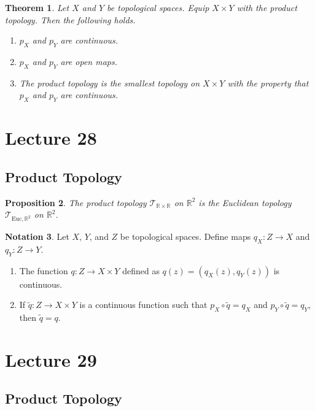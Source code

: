 \documentclass[ 12pt ]{article}
\newcounter{lecture_num}
\theoremstyle{plain}
\theoremstyle{plain}
\newtheorem{theorem}{Theorem}[lecture_num]
\newtheorem{proposition}[theorem]{Proposition}
\theoremstyle{definition}
\newtheorem{notation}[theorem]{Notation}
\theoremstyle{remark}
\begin{document}
\begin{theorem}
	Let $X$ and $Y$ be topological spaces. Equip $X \times Y$ with the product topology. Then the following holds.
	\begin{enumerate}
		\item $p_X$ and $p_Y$ are continuous.
		\item $p_X$ and $p_Y$ are open maps.
		\item The product topology is the \textit{smallest} topology on $X \times Y$ with the property that $p_X$ and $p_Y$ are continuous.
	\end{enumerate}
\end{theorem}


\setcounter{lecture_num}{28}
\setcounter{theorem}{0}
\section*{Lecture 28}

\subsection*{Product Topology}

\begin{proposition}
	The product topology $\mathcal{T}_{\mathbb{R} \times \mathbb{R}}$ on $\mathbb{R}^2$ is the Euclidean topology $\mathcal{T}_{\mathrm{Euc}, \mathbb{R}^2}$ on $\mathbb{R}^2$.
\end{proposition}

\begin{notation}
	Let $X$, $Y$, and $Z$ be topological spaces. Define maps $q_X : Z \to X$ and $q_Y : Z \to Y$.
	\begin{enumerate}
		\item The function $q : Z \to X \times Y$ defined as $q(z) = ( q_X(z), q_Y(z) )$ is continuous.
		\item If $\widetilde{q} : Z \to X \times Y$ is a continuous function such that $p_X \circ \widetilde{q} = q_X$ and $p_Y \circ \widetilde{q} = q_Y$, then $\widetilde{q} = q$.
	\end{enumerate}
\end{notation}


\setcounter{lecture_num}{29}
\setcounter{theorem}{0}
\section*{Lecture 29}

\subsection*{Product Topology}
\end{document}
